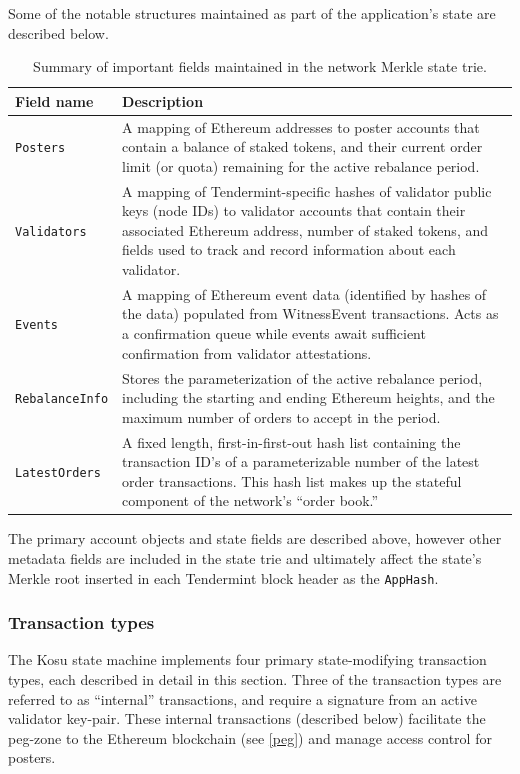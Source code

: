 \documentclass[10pt]{article}
\begin{document}
Some of the notable structures maintained as part of the application's state are described below.

\bgroup
\def\arraystretch{1.2}
\begin{table}[H]
\centering
\label{table:table3}
\begin{tabularx}{1\textwidth}{|l|X|}
\hline
\textbf{Field name} & \textbf{Description} \\
\hline
\texttt{Posters} & A mapping of Ethereum addresses to poster accounts that contain a balance of staked tokens, and their current order limit (or quota) remaining for the active rebalance period. \\
\hline
\texttt{Validators} & A mapping of Tendermint-specific hashes of validator public keys (node IDs) to validator accounts that contain their associated Ethereum address, number of staked tokens, and fields used to track and record information about each validator. \\
\hline
\texttt{Events} & A mapping of Ethereum event data (identified by hashes of the data) populated from WitnessEvent transactions. Acts as a confirmation queue while events await sufficient confirmation from validator attestations. \\
\hline
\texttt{RebalanceInfo} & Stores the parameterization of the active rebalance period, including the starting and ending Ethereum heights, and the maximum number of orders to accept in the period. \\
\hline
\texttt{LatestOrders} & A fixed length, first-in-first-out hash list containing the transaction ID’s of a parameterizable number of the latest order transactions. This hash list makes up the stateful component of the network’s ``order book.'' \\
\hline
\end{tabularx}
\caption{Summary of important fields maintained in the network Merkle state trie.} 
\end{table}
\egroup

The primary account objects and state fields are described above, however other metadata fields are included in the state trie and ultimately affect the state’s Merkle root inserted in each Tendermint block header as the \texttt{AppHash}.
\subsubsection{Transaction types}\label{tm-network-tx-types}
The Kosu state machine implements four primary state-modifying transaction types, each described in detail in this section. Three of the transaction types are referred to as ``internal'' transactions, and require a signature from an active validator key-pair. These internal transactions (described below) facilitate the peg-zone to the Ethereum blockchain (see \ref{peg}) and manage access control for posters. 
\medskip
\end{document}
